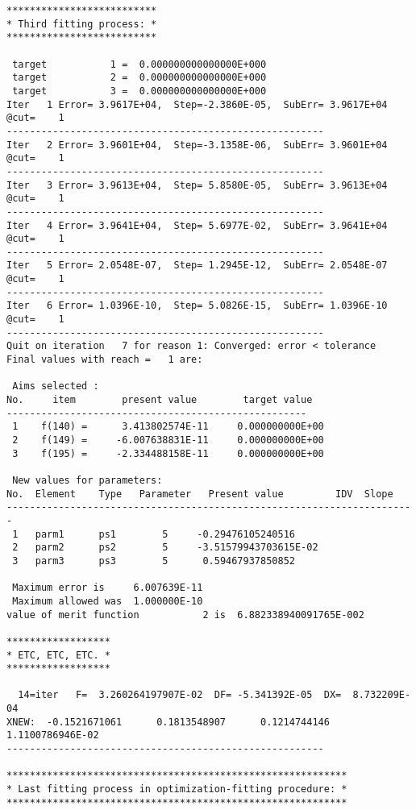 \begin{footnotesize}
\begin{verbatim}
**************************
* Third fitting process: *
**************************

 target           1 =  0.000000000000000E+000
 target           2 =  0.000000000000000E+000
 target           3 =  0.000000000000000E+000
Iter   1 Error= 3.9617E+04,  Step=-2.3860E-05,  SubErr= 3.9617E+04 @cut=    1
-------------------------------------------------------
Iter   2 Error= 3.9601E+04,  Step=-3.1358E-06,  SubErr= 3.9601E+04 @cut=    1
-------------------------------------------------------
Iter   3 Error= 3.9613E+04,  Step= 5.8580E-05,  SubErr= 3.9613E+04 @cut=    1
-------------------------------------------------------
Iter   4 Error= 3.9641E+04,  Step= 5.6977E-02,  SubErr= 3.9641E+04 @cut=    1
-------------------------------------------------------
Iter   5 Error= 2.0548E-07,  Step= 1.2945E-12,  SubErr= 2.0548E-07 @cut=    1
-------------------------------------------------------
Iter   6 Error= 1.0396E-10,  Step= 5.0826E-15,  SubErr= 1.0396E-10 @cut=    1
-------------------------------------------------------
Quit on iteration   7 for reason 1: Converged: error < tolerance
Final values with reach =   1 are:

 Aims selected :
No.     item        present value        target value
----------------------------------------------------
 1    f(140) =      3.413802574E-11     0.000000000E+00
 2    f(149) =     -6.007638831E-11     0.000000000E+00
 3    f(195) =     -2.334488158E-11     0.000000000E+00

 New values for parameters:
No.  Element    Type   Parameter   Present value         IDV  Slope
-----------------------------------------------------------------------
 1   parm1      ps1        5     -0.29476105240516
 2   parm2      ps2        5     -3.51579943703615E-02
 3   parm3      ps3        5      0.59467937850852

 Maximum error is     6.007639E-11
 Maximum allowed was  1.000000E-10
value of merit function           2 is  6.882338940091765E-002

******************
* ETC, ETC, ETC. *
******************

  14=iter   F=  3.260264197907E-02  DF= -5.341392E-05  DX=  8.732209E-04
XNEW:  -0.1521671061      0.1813548907      0.1214744146      1.1100786946E-02
-------------------------------------------------------

***********************************************************
* Last fitting process in optimization-fitting procedure: *
***********************************************************



\end{verbatim}
\end{footnotesize}
